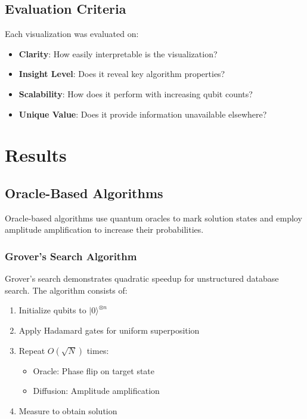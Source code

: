 \documentclass[12pt,a4paper]{article}
\begin{document}
\subsection{Evaluation Criteria}

Each visualization was evaluated on:

\begin{itemize}
	\item \textbf{Clarity}: How easily interpretable is the visualization?
	\item \textbf{Insight Level}: Does it reveal key algorithm properties?
	\item \textbf{Scalability}: How does it perform with increasing qubit counts?
	\item \textbf{Unique Value}: Does it provide information unavailable elsewhere?
\end{itemize}

\newpage

\section{Results}

\subsection{Oracle-Based Algorithms}

Oracle-based algorithms use quantum oracles to mark solution states and employ amplitude amplification to increase their probabilities.

\subsubsection{Grover's Search Algorithm}

Grover's search demonstrates quadratic speedup for unstructured database search. The algorithm consists of:
\begin{enumerate}
	\item Initialize qubits to $|0\rangle^{\otimes n}$
	\item Apply Hadamard gates for uniform superposition
	\item Repeat $O(\sqrt{N})$ times:
	      \begin{itemize}
		      \item Oracle: Phase flip on target state
		      \item Diffusion: Amplitude amplification
	      \end{itemize}
	\item Measure to obtain solution
\end{enumerate}
\end{document}

